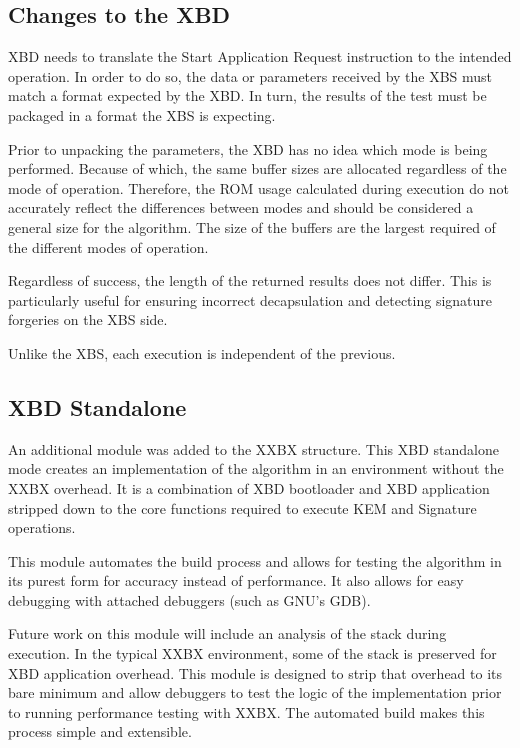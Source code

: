 \documentclass[10pt]{article}
\begin{document}
\subsection{Changes to the XBD}
XBD needs to translate the Start Application Request instruction to the intended operation. 
In order to do so, the data or parameters received by the XBS must match a format expected 
by the XBD. In turn, the results of the test must be packaged in a format the XBS is expecting.

Prior to unpacking the parameters, the XBD has no idea which mode is being performed. 
Because of which, the same buffer sizes are allocated regardless of the mode of operation. 
Therefore, the ROM usage calculated during execution do not accurately reflect the differences 
between modes and should be considered a general size for the algorithm. 
The size of the buffers are the largest required of the different modes of operation.

Regardless of success, the length of the returned results does not differ. 
This is particularly useful for ensuring incorrect decapsulation and detecting signature 
forgeries on the XBS side.

Unlike the XBS, each execution is independent of the previous.

\subsection{XBD Standalone}
An additional module was added to the XXBX structure. This XBD standalone mode creates 
an implementation of the algorithm in an environment without the XXBX overhead. It is a 
combination of XBD bootloader and XBD application stripped down to the core functions 
required to execute KEM and Signature operations.

This module automates the build process and allows for testing the algorithm in its purest 
form for accuracy instead of performance. It also allows for easy debugging with attached 
debuggers (such as GNU’s GDB).

Future work on this module will include an analysis of the stack during execution. 
In the typical XXBX environment, some of the stack is preserved for XBD application overhead. 
This module is designed to strip that overhead to its bare minimum and allow debuggers to 
test the logic of the implementation prior to running performance testing with XXBX. 
The automated build makes this process simple and extensible.
\end{document}
